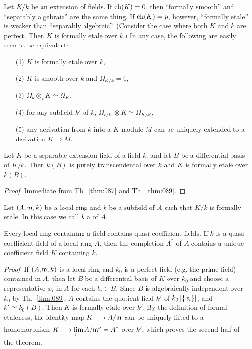 \documentclass[../main]{subfiles}
\begin{document}
Let $K/k$ be an extension of fields. If $\operatorname{ch}(K) = 0$, then ``formally smooth'' and ``separably algebraic'' are the same
thing. If $\operatorname{ch}(K)= p$, however, ``formally etale'' is weaker than ``separably algebraic''. (Consider the case where both $K$ and $k$ are perfect. Then $K$ is formally etale over $k$.) In any case, the following are easily seen to be equivalent: 
\begin{enumerate}
    \item[(1)] $K$ is formally etale over $k$, 
    \item[(2)] $K$ is smooth over $k$ and $\Omega_{K/k}=0$,
    \item[(3)] $\Omega_k\otimes_k K\simeq \Omega_K$,
    \item[(4)] for any subfield $k'$ of $k$, $\Omega_{k/k'}\otimes K\simeq\Omega_{K/k'}$,
    \item[(5)] any derivation from $k$ into a $K$-module $M$ can be uniquely extended to a derivation $K\longrightarrow M$.
\end{enumerate}
\begin{theorem}
\label{thm:090}
    Let $K$ be a separable extension field of a field $k$, and let $B$ be a differential basis of $K/k$. Then $k(B)$ is purely transcendental over $k$ and $K$ is formally etale over $k(B)$. 
\end{theorem}
\begin{proof}
    Immediate from Th.~\ref{thm:087} and Th.~\ref{thm:089}.
\end{proof}

\newparagraph
Let $(A,\mathfrak{m}, k)$ be a local ring and $k$ be a subfield of $A$ such that $K/k$ is formally etale. In this case we call $k$ a  of $A$. 

\begin{theorem}
\label{thm:091}
    Every local ring containing a field contains quasi-coefficient fields. If $k$ is a quasi-coefficient field of a local ring $A$, then the completion $A^\ast$ of $A$ contains a unique coefficient field $K$ containing $k$. 
\end{theorem}
\begin{proof}
    If $(A,\mathfrak{m},k)$ is a local ring and $k_0$ is a perfect field (e.g. the prime field) contained in $A$, then let $B$ be a differential basis of $K$ over $k_0$ and choose a representative $x_i$ in $A$ for each $b_i \in B$. Since $B$ is algebraically independent over $k_0$ by Th.~\ref{thm:089}, $A$ contains the quotient field $k'$ of $k_0\left[\left\{x_i\right\}\right]$, and $k' \simeq k_0(B)$. Then $K$ is formally etale over $k'$. By the definition of formal etaleness, the identity map $K \varrightarrow{} A/\ideal{m}$ can be uniquely lifted to a homomorphism $K \varrightarrow{} \displaystyle\lim_{\longleftarrow} A/\ideal{m}^\nu = A^\ast$ over $k'$, which proves the second half of the theorem. 
\end{proof}
\end{document}
